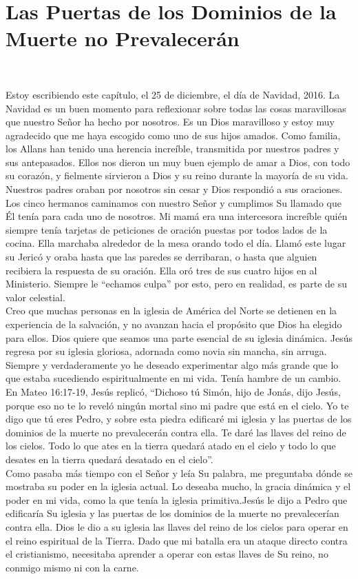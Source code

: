 \documentclass[twoside, 12pt]{book}
\begin{document}
\chapter{Las Puertas de los Dominios de la Muerte no Prevalecerán}
\

Estoy escribiendo este capítulo, el 25 de diciembre, el día de Navidad, 2016. La Navidad es un buen momento para reflexionar sobre todas las cosas maravillosas que nuestro Señor ha hecho por nosotros. Es un Dios maravilloso y estoy muy agradecido que me haya escogido como uno de sus hijos amados. Como familia, los Allans han tenido una herencia increíble, transmitida por nuestros padres y sus antepasados. Ellos nos dieron un muy buen ejemplo de amar a Dios, con todo su corazón, y fielmente sirvieron a Dios y su reino durante la mayoría de su vida. Nuestros padres oraban por nosotros sin cesar y Dios respondió a sus oraciones. Los cinco hermanos caminamos con nuestro Señor y cumplimos Su llamado que Él tenía para cada uno de nosotros. Mi mamá era una intercesora increíble quién siempre tenía tarjetas de peticiones de oración puestas por todos lados de la cocina. Ella marchaba alrededor de la mesa orando todo el día. Llamó este lugar su Jericó y oraba hasta que las paredes se derribaran, o hasta que alguien recibiera la respuesta de su oración.  Ella oró tres de sus cuatro hijos en al Ministerio. Siempre le “echamos culpa” por esto, pero en realidad, es parte de su valor celestial.\\

Creo que muchas personas en la iglesia de América del Norte se detienen en la experiencia de la salvación, y no avanzan hacia el propósito que Dios ha elegido para ellos. Dios quiere que seamos una parte esencial de su iglesia dinámica. Jesús regresa por su iglesia gloriosa, adornada como novia sin mancha, sin arruga. Siempre y verdaderamente yo he deseado experimentar algo más grande que lo que estaba sucediendo espiritualmente en mi vida. Tenía hambre de un cambio.
En Mateo 16:17-19, Jesús replicó, “Dichoso tú Simón, hijo de Jonás, dijo Jesús, porque eso no te lo reveló ningún mortal sino mi padre que está en el cielo. Yo te digo que tú eres Pedro, y sobre esta piedra edificaré mi iglesia y las puertas de los dominios de la muerte no prevalecerán contra ella. Te daré las llaves del reino de los cielos. Todo lo que ates en la tierra quedará atado en el cielo y todo lo que desates en la tierra quedará desatado en el cielo”.\\

Como pasaba más tiempo con el Señor y leía Su palabra, me preguntaba dónde se mostraba su poder en la iglesia actual. Lo deseaba mucho, la gracia dinámica y el poder en mi vida, como la que tenía la iglesia primitiva.Jesús le dijo a Pedro que edificaría Su iglesia y las puertas de los dominios de la muerte no prevalecerían contra ella. Dios le dio a su iglesia las llaves del reino de los cielos para operar en el reino espiritual de la Tierra. Dado que mi batalla era un ataque directo contra el cristianismo, necesitaba aprender a operar con estas llaves de Su reino, no conmigo mismo ni con la carne.\\
\end{document}
